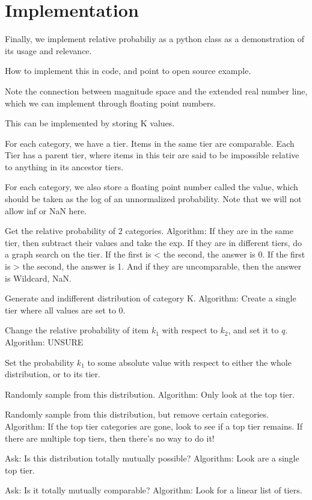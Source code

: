 \documentclass[twoside]{article}
\theoremstyle{plain}%
\theoremstyle{definition}
\theoremstyle{remark}
\begin{document}
\section{Implementation}

Finally, we implement relative probabiliy as a python class as a demonstration of its usage and relevance.

How to implement this in code, and point to open source example.

Note the connection between magnitude space and the extended real number line, which we can implement through floating point numbers.

This can be implemented by storing K values.

For each category, we have a tier. Items in the same tier are comparable. Each Tier has a parent tier, where items in this teir are said to be impossible relative to anything in its ancestor tiers.

For each category, we also store a floating point number called the value, which should be taken as the log of an unnormalized probability. Note that we will not allow inf or NaN here.

Get the relative probability of 2 categories. Algorithm: If they are in the same tier, then subtract their values and take the exp. If they are in different tiers, do a graph search on the tier. If the first is < the second, the answer is 0. If the first is > the second, the answer is 1. And if they are uncomparable, then the answer is Wildcard, NaN.

Generate and indifferent distribution of category K. Algorithm: Create a single tier where all values are set to 0.

Change the relative probability of item \(k_1\) with respect to \(k_2\), and set it to \(q\). Algorithm: UNSURE

Set the probability \(k_1\) to some absolute value with respect to either the whole distribution, or to its tier.

Randomly sample from this distribution. Algorithm: Only look at the top tier.

Randomly sample from this distribution, but remove certain categories. Algorithm: If the top tier categories are gone, look to see if a top tier remains. If there are multiple top tiers, then there's no way to do it!

Ask: Is this distribution totally mutually possible? Algorithm: Look are a single top tier.

Ask: Is it totally mutually comparable? Algorithm: Look for a linear list of tiers.
\end{document}
